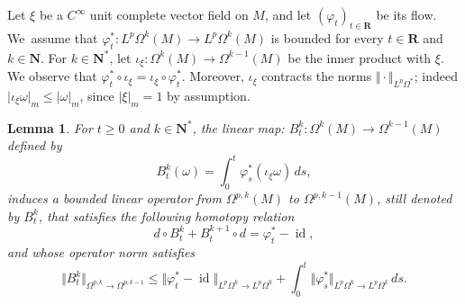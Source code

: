 \documentclass[JEP,XML,SOM,Unicode,published]{cedram}
\newcommand{\NN}{\mathbf{N}}
\newcommand{\RR}{\mathbf{R}}
\theoremstyle{plain}
\newtheorem{lemma}[equation]{Lemma}
\theoremstyle{remark}
\theoremstyle{definition}
\DeclareMathOperator{\id}{id}
\begin{document}
Let $\xi$ be a $C^\infty$ unit complete vector field on $M$, and let $(\varphi_t)_{t \in\RR}$ be its flow.
We~assume that $\varphi_t^*: L^p \Omega^k (M) \to L^p \Omega^k (M)$ is bounded for every $t \in \RR$ and $k \in \NN$.
For $k \in \NN^*$, let $\iota_\xi: \Omega^k (M) \to \Omega^{k-1} (M)$ be the inner product with $\xi$.
We observe that $\varphi_t^* \circ \iota_\xi = \iota_\xi \circ \varphi_t^*$. Moreover, $\iota_\xi$ contracts the norms
$\Vert {\cdot} \Vert_{L^p \Omega^*}$; indeed $\vert \iota_\xi \omega \vert_m \leqslant \vert \omega \vert_m$, since $\vert \xi \vert_m =1$ by assumption.

\begin{lemma}\label{vanishing-lemma}
For $t \geqslant 0$ and $k \in \NN^*$, the linear map: $B_t^k: \Omega^k (M) \to \Omega^{k-1} (M)$
defined by
\[B_t^k (\omega) = \int_0^t \varphi_s^* (\iota_\xi \omega) \,ds,\]
induces a bounded linear operator from $\Omega^{p,k}(M)$ to $\Omega^{p, k-1}(M)$, still denoted by $B_t^k$,
that satisfies the following homotopy relation
\[d \circ B_t^k + B_t^{k+1} \circ d = \varphi_t^* - \id,\]
and whose operator norm satisfies
\[\Vert B_t^k \Vert_{\Omega^{p,k} \to \Omega^{p,k-1}} \leqslant \Vert \varphi_t^* - \id\Vert_{L^p \Omega^k \to L^p \Omega^k} +
\int_0^t \Vert \varphi_s^* \Vert_{L^p \Omega^k \to L^p \Omega^k} \,ds.\]

\end{lemma}
\end{document}
